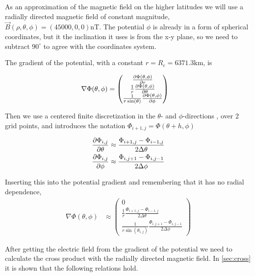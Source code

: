 \documentclass[x11names]{article}
\renewcommand{\va}{\vec}
\begin{document}
    As an approximation of the magnetic field on the higher latitudes we will use a radially directed magnetic field of constant magnitude, \(\va{B}(\rho, \theta, \phi) = (45000,0,0) \si{\nano\tesla}\). The potential \(\phi\) is already in a form of spherical coordinates, but it the inclination it uses is from the x-y plane, so we need to subtract \(90^\circ\) to agree with the coordinates system. 

    The gradient of the potential, with a constant \(r = R_e = 6371.3 \si{\kilo \meter}\), is

    \begin{align}
      \nabla \Phi(\theta,\phi) &= 
      \begin{pmatrix}
        \pdv{\Phi(\theta,\phi)}{r}
        \\
        \frac{1}{r} \pdv{\Phi(\theta,\phi)}{\theta}
        \\
        \frac{1}{r\sin(\theta)} \pdv{\Phi(\theta,\phi)}{\phi}
      \end{pmatrix}
    \end{align}

    \noindent Then we use a centered finite discretization in the \(\theta\)- and \(\phi\)-directions , over 2 grid points, and introduces the notation \(\Phi_{i+1,j} = \Phi(\theta + h, \phi)\)

    \begin{align}
      \pdv{\Phi_{i,j}}{\theta} &\approx \frac{ \Phi_{i+1, j} - \Phi_{i - 1, j} }{2 \Delta \theta}
      \\
      \pdv{\Phi_{i,j}}{\phi} &\approx \frac{ \Phi_{i, j + 1} - \Phi_{i , j - 1} }{2\Delta \phi}
    \end{align}

    Inserting this into the potential gradient and remembering that it has no radial dependence,
    \begin{align}
      \nabla \Phi(\theta,\phi) &\approx
      \begin{pmatrix}
        0
        \\
        \frac{1}{r} \frac{ \Phi_{i+1, j} - \Phi_{i - 1, j} }{2 \Delta \theta}
        \\
        \frac{1}{r\sin(\theta_{i,j})}  \frac{ \Phi_{i, j + 1} - \Phi_{i , j - 1} }{2\Delta \phi}
      \end{pmatrix} \label{eq:discretization}
    \end{align}

    After getting the electric field from the gradient of the potential we need to calculate the cross product with the radially directed magnetic field. In \cref{sec:cross} it is shown that the following relations hold.
\end{document}
